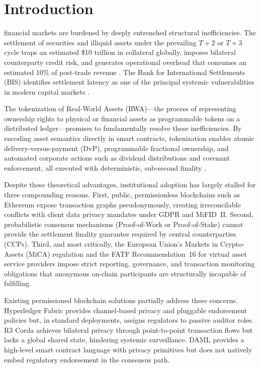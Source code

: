 \documentclass[journal,10pt,twocolumn]{IEEEtran}
\begin{document}
\section{Introduction}
\label{sec:intro}

 financial markets are burdened by deeply entrenched structural inefficiencies. The settlement of securities and illiquid assets under the prevailing $T+2$ or $T+3$ cycle traps an estimated \$10 trillion in collateral globally, imposes bilateral counterparty credit risk, and generates operational overhead that consumes an estimated 10\% of post-trade revenue \cite{ref:rwa_fsb, ref:ecb_dlt}. The Bank for International Settlements (BIS) identifies settlement latency as one of the principal systemic vulnerabilities in modern capital markets \cite{ref:bis_tokenisation}.

The tokenization of Real-World Assets (RWA)---the process of representing ownership rights to physical or financial assets as programmable tokens on a distributed ledger---promises to fundamentally resolve these inefficiencies. By encoding asset semantics directly in smart contracts, tokenization enables atomic delivery-versus-payment (DvP), programmable fractional ownership, and automated corporate actions such as dividend distributions and covenant enforcement, all executed with deterministic, sub-second finality \cite{ref:setl2023}.

Despite these theoretical advantages, institutional adoption has largely stalled for three compounding reasons. First, public, permissionless blockchains such as Ethereum expose transaction graphs pseudonymously, creating irreconcilable conflicts with client data privacy mandates under GDPR and MiFID~II. Second, probabilistic consensus mechanisms (Proof-of-Work or Proof-of-Stake) cannot provide the settlement finality guarantee required by central counterparties (CCPs). Third, and most critically, the European Union's Markets in Crypto-Assets (MiCA) regulation \cite{ref:mica} and the FATF Recommendation~16 for virtual asset service providers \cite{ref:fatf} impose strict reporting, governance, and transaction monitoring obligations that anonymous on-chain participants are structurally incapable of fulfilling.

Existing permissioned blockchain solutions partially address these concerns. Hyperledger Fabric \cite{ref:fabric} provides channel-based privacy and pluggable endorsement policies but, in standard deployments, assigns regulators to passive auditor roles. R3 Corda \cite{ref:corda} achieves bilateral privacy through point-to-point transaction flows but lacks a global shared state, hindering systemic surveillance. DAML \cite{ref:daml} provides a high-level smart contract language with privacy primitives but does not natively embed regulatory endorsement in the consensus path.
\end{document}
